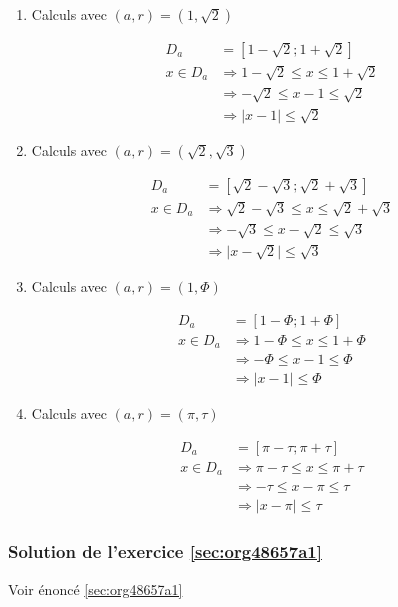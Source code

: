 \documentclass[a4paper, 11pt, twoside]{article}
\begin{document}
\begin{enumerate}
\item Calculs avec \((a, r) = (1, \sqrt{2})\)

\begin{align*}
D_a &= [1-\sqrt{2} ; 1+\sqrt{2}]\\
x\in D_a &\Rightarrow 1-\sqrt{2}\leq x\leq 1+\sqrt{2}\\
&\Rightarrow -\sqrt{2}\leq x - 1\leq \sqrt{2}\\
&\Rightarrow \lvert x - 1\rvert \leq \sqrt{2}
\end{align*}
\item Calculs avec \((a, r) = (\sqrt{2}, \sqrt{3})\)

\begin{align*}
D_a &= [\sqrt{2}-\sqrt{3} ; \sqrt{2}+\sqrt{3}]\\
x\in D_a &\Rightarrow \sqrt{2}-\sqrt{3}\leq x\leq \sqrt{2}+\sqrt{3}\\
&\Rightarrow -\sqrt{3}\leq x - \sqrt{2}\leq \sqrt{3}\\
&\Rightarrow \lvert x - \sqrt{2}\rvert \leq \sqrt{3}
\end{align*}
\item Calculs avec \((a, r) = (1, \Phi)\)

\begin{align*}
D_a &= [1-\Phi ; 1+\Phi]\\
x\in D_a &\Rightarrow 1-\Phi\leq x\leq 1+\Phi\\
&\Rightarrow -\Phi\leq x - 1\leq \Phi\\
&\Rightarrow \lvert x - 1\rvert \leq \Phi
\end{align*}
\item Calculs avec \((a, r) = (\pi, \tau)\)

\begin{align*}
D_a &= [\pi-\tau ; \pi+\tau]\\
x\in D_a &\Rightarrow \pi-\tau\leq x\leq \pi+\tau\\
&\Rightarrow -\tau\leq x - \pi\leq \tau\\
&\Rightarrow \lvert x - \pi\rvert \leq \tau
\end{align*}
\end{enumerate}
\subsubsection{Solution de l'exercice \ref{sec:org48657a1}}
\label{sec:org409520d}
Voir énoncé \ref{sec:org48657a1}
\end{document}
